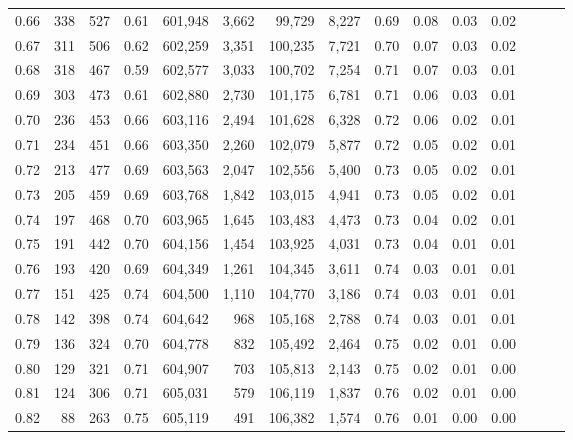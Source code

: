 \begin{tabular}{rrrrrrrrrrrrrrr}
0.66 &     338 &    527 &  0.61 &  601,948 &    3,662 &   99,729 &    8,227 &  0.69 &  0.08 &  0.03 &      0.02 \\
0.67 &     311 &    506 &  0.62 &  602,259 &    3,351 &  100,235 &    7,721 &  0.70 &  0.07 &  0.03 &      0.02 \\
0.68 &     318 &    467 &  0.59 &  602,577 &    3,033 &  100,702 &    7,254 &  0.71 &  0.07 &  0.03 &      0.01 \\
0.69 &     303 &    473 &  0.61 &  602,880 &    2,730 &  101,175 &    6,781 &  0.71 &  0.06 &  0.03 &      0.01 \\
0.70 &     236 &    453 &  0.66 &  603,116 &    2,494 &  101,628 &    6,328 &  0.72 &  0.06 &  0.02 &      0.01 \\
0.71 &     234 &    451 &  0.66 &  603,350 &    2,260 &  102,079 &    5,877 &  0.72 &  0.05 &  0.02 &      0.01 \\
0.72 &     213 &    477 &  0.69 &  603,563 &    2,047 &  102,556 &    5,400 &  0.73 &  0.05 &  0.02 &      0.01 \\
0.73 &     205 &    459 &  0.69 &  603,768 &    1,842 &  103,015 &    4,941 &  0.73 &  0.05 &  0.02 &      0.01 \\
0.74 &     197 &    468 &  0.70 &  603,965 &    1,645 &  103,483 &    4,473 &  0.73 &  0.04 &  0.02 &      0.01 \\
0.75 &     191 &    442 &  0.70 &  604,156 &    1,454 &  103,925 &    4,031 &  0.73 &  0.04 &  0.01 &      0.01 \\
0.76 &     193 &    420 &  0.69 &  604,349 &    1,261 &  104,345 &    3,611 &  0.74 &  0.03 &  0.01 &      0.01 \\
0.77 &     151 &    425 &  0.74 &  604,500 &    1,110 &  104,770 &    3,186 &  0.74 &  0.03 &  0.01 &      0.01 \\
0.78 &     142 &    398 &  0.74 &  604,642 &      968 &  105,168 &    2,788 &  0.74 &  0.03 &  0.01 &      0.01 \\
0.79 &     136 &    324 &  0.70 &  604,778 &      832 &  105,492 &    2,464 &  0.75 &  0.02 &  0.01 &      0.00 \\
0.80 &     129 &    321 &  0.71 &  604,907 &      703 &  105,813 &    2,143 &  0.75 &  0.02 &  0.01 &      0.00 \\
0.81 &     124 &    306 &  0.71 &  605,031 &      579 &  106,119 &    1,837 &  0.76 &  0.02 &  0.01 &      0.00 \\
0.82 &      88 &    263 &  0.75 &  605,119 &      491 &  106,382 &    1,574 &  0.76 &  0.01 &  0.00 &      0.00 \\

\end{tabular}
